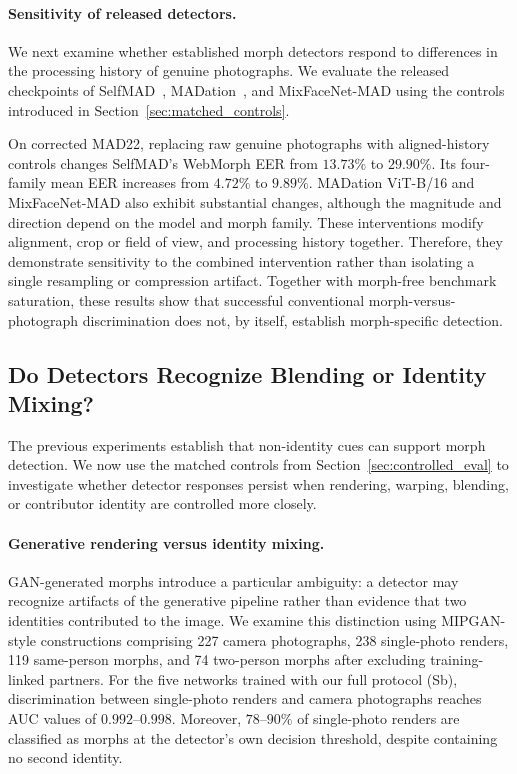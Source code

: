 \paragraph{Sensitivity of released detectors.}
We next examine whether established morph detectors
respond to differences in the processing history of
genuine photographs. We evaluate the released
checkpoints of SelfMAD~\cite{ivanovska2025selfmad},
MADation~\cite{caldeira2025madation}, and
MixFaceNet-MAD using the controls introduced in
Section~\ref{sec:matched_controls}.

On corrected MAD22, replacing raw genuine photographs
with aligned-history controls changes SelfMAD's
WebMorph EER from $13.73\%$ to $29.90\%$.
Its four-family mean EER increases from $4.72\%$
to $9.89\%$. MADation ViT-B/16 and MixFaceNet-MAD
also exhibit substantial changes, although the
magnitude and direction depend on the model and
morph family.
These interventions modify alignment, crop or field
of view, and processing history together. Therefore,
they demonstrate sensitivity to the combined
intervention rather than isolating a single resampling
or compression artifact.
Together with morph-free benchmark saturation,
these results show that successful conventional
morph-versus-photograph discrimination does not,
by itself, establish morph-specific detection.



\subsection{Do Detectors Recognize Blending or Identity Mixing?}
\label{sec:blend_results}

The previous experiments establish that non-identity
cues can support morph detection. We now use the
matched controls from Section~\ref{sec:controlled_eval}
to investigate whether detector responses persist
when rendering, warping, blending, or contributor
identity are controlled more closely.

\paragraph{Generative rendering versus identity mixing.}
GAN-generated morphs introduce a particular ambiguity:
a detector may recognize artifacts of the generative
pipeline rather than evidence that two identities
contributed to the image. We examine this distinction using MIPGAN-style
constructions comprising 227 camera photographs,
238 single-photo renders, 119 same-person morphs,
and 74 two-person morphs after excluding
training-linked partners. For the five networks trained with our full protocol
(Sb), discrimination between single-photo renders
and camera photographs reaches AUC values of
$0.992$--$0.998$.
Moreover, $78$--$90\%$ of single-photo renders
are classified as morphs at the detector's own
decision threshold, despite containing no
second identity.

